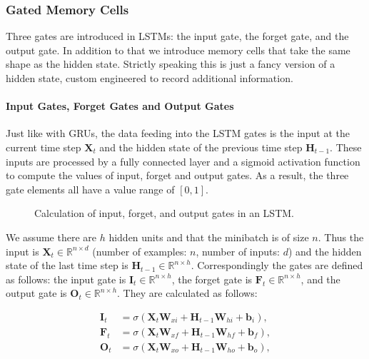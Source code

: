 \subsubsection{Gated Memory Cells}

Three gates are introduced in LSTMs: the input gate, the forget gate, and the output gate. In addition to that we introduce memory cells that take the same shape as the hidden state. Strictly speaking this is just a fancy version of a hidden state, custom engineered to record additional information.

\paragraph{Input Gates, Forget Gates and Output Gates}

Just like with GRUs, the data feeding into the LSTM gates is the input at the current time step $\mathbf{X}_t$ and the hidden state of the previous time step $\mathbf{H}_{t-1}$. These inputs are processed by a fully connected layer and a sigmoid activation function to compute the values of input, forget and output gates. As a result, the three gate elements all have a value range of $[0,1]$.

\begin{figure}[hpt]
	\centering
	
	\caption{Calculation of input, forget, and output gates in an LSTM.}
	\label{fig:lstm_0}
\end{figure}

We assume there are $h$ hidden units and that the minibatch is of size $n$. Thus
the input is $\mathbf{X}_t \in \mathbb{R}^{n \times d}$ (number of examples:
$n$, number of inputs: $d$) and the hidden state of the last time step is $\mathbf{H}_{t-1} \in \mathbb{R}^{n \times h}$. Correspondingly the gates are defined as follows: the input gate is $\mathbf{I}_t \in \mathbb{R}^{n \times h}$, the forget gate is $\mathbf{F}_t \in \mathbb{R}^{n \times h}$, and the output gate is $\mathbf{O}_t \in \mathbb{R}^{n \times h}$. They are calculated as follows:

$$
\begin{aligned}
\mathbf{I}_t &= \sigma(\mathbf{X}_t \mathbf{W}_{xi} + \mathbf{H}_{t-1} \mathbf{W}_{hi} + \mathbf{b}_i),\\
\mathbf{F}_t &= \sigma(\mathbf{X}_t \mathbf{W}_{xf} + \mathbf{H}_{t-1} \mathbf{W}_{hf} + \mathbf{b}_f),\\
\mathbf{O}_t &= \sigma(\mathbf{X}_t \mathbf{W}_{xo} + \mathbf{H}_{t-1} \mathbf{W}_{ho} + \mathbf{b}_o),
\end{aligned}
$$

